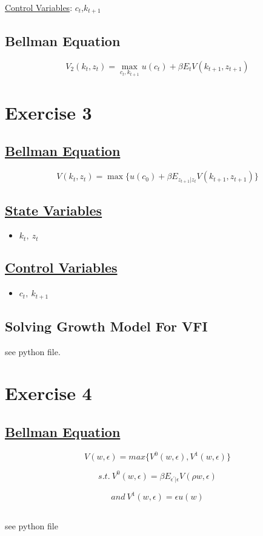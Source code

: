 \documentclass{article}
\begin{document}
\underline{Control Variables}: $c_t$,$k_{t+1}$

\subsection{Bellman Equation}

\[ V_2(k_t, z_t) = \max_{c_t, k_{t+1}} u(c_t) + \beta E_tV(k_{t+1},z_{t+1}) \]

\section{Exercise 3}

\subsection{\underline{Bellman Equation}}


\[ V(k_t, z_t) = \max \{ u(c_0) + \beta E_{z_{t+1} | z_t} V(k_{t+1}, z_{t+1}) \} \]


\subsection{\underline{State Variables}}
\begin{itemize}
  \item $k_t, \ z_t $
\end{itemize}

\subsection{\underline{Control Variables}}
  \begin{itemize}
    \item $c_t , \ k_{t+1} $
  \end{itemize}

\subsection{Solving Growth Model For VFI}

see python file.

\section{Exercise 4}
\subsection{\underline{Bellman Equation}}

\[ V(w,\epsilon) = max\{V^0(w,\epsilon), V^1(w,\epsilon)\}\]

\[s.t. \ V^0(w,\epsilon) = \beta E_{\epsilon^\prime | \epsilon} V(\rho w, \epsilon)\]

\[and \ V^1(w,\epsilon) = \epsilon u(w)\]

\subsection{}

see python file
\end{document}
